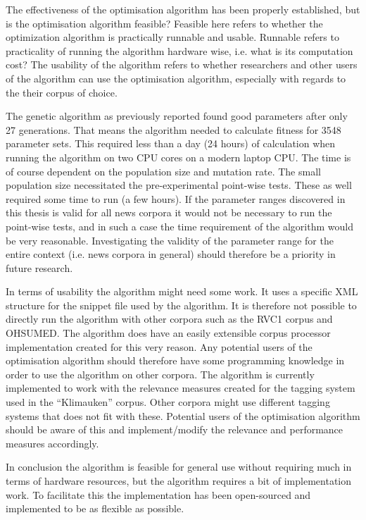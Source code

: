 The effectiveness of the optimisation algorithm has been properly established, but is the optimisation algorithm feasible? Feasible here refers to whether the optimization algorithm is practically runnable and usable. Runnable refers to practicality of running the algorithm hardware wise, i.e. what is its computation cost? The usability of the algorithm refers to whether researchers and other users of the \CTC algorithm can use the optimisation algorithm, especially with regards to the their corpus of choice.

The genetic algorithm as previously reported found good parameters after only 27 generations. That means the algorithm needed to calculate fitness for 3548 parameter sets. This required less than a day (24 hours) of calculation when running the algorithm on two CPU cores on a modern laptop CPU. The time is of course dependent on the population size and mutation rate. The small population size necessitated the pre-experimental point-wise tests. These as well required some time to run (a few hours). If the parameter ranges discovered in this thesis is valid for all news corpora it would not be necessary to run the point-wise tests, and in such a case the time requirement of the algorithm would be very reasonable. Investigating the validity of the parameter range for the entire context (i.e. news corpora in general) should therefore be a priority in future research.

In terms of usability the algorithm might need some work. It uses a specific XML structure for the snippet file used by the algorithm. It is therefore not possible to directly run the algorithm with other corpora such as the RVC1 corpus and OHSUMED. The algorithm does have an easily extensible corpus processor implementation created for this very reason. Any potential users of the optimisation algorithm should therefore have some programming knowledge in order to use the algorithm on other corpora. The algorithm is currently implemented to work with the relevance measures created for the tagging system used in the ``Klimauken'' corpus. Other corpora might use different tagging systems that does not fit with these. Potential users of the optimisation algorithm should be aware of this and implement/modify the relevance and performance measures accordingly.

In conclusion the algorithm is feasible for general use without requiring much in terms of hardware resources, but the algorithm requires a bit of implementation work. To facilitate this the implementation has been open-sourced and implemented to be as flexible as possible.